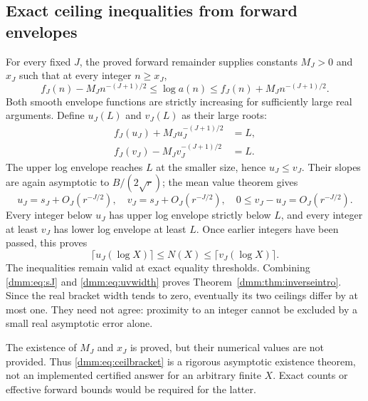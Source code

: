 \documentclass[11pt,letterpaper]{article}
\numberwithin{equation}{section}
\theoremstyle{definition}\newtheorem{definition}[theorem]{Definition}
\theoremstyle{remark}\newtheorem{remark}[theorem]{Remark}
\begin{document}
\subsection{Exact ceiling inequalities from forward envelopes}
For every fixed $J$, the proved forward remainder supplies constants $M_J>0$ and $x_J$ such that at every integer $n\ge x_J$,
\begin{equation}\label{dmm:eq:envelopes}
f_J(n)-M_Jn^{-(J+1)/2}
\le\log a(n)\le
f_J(n)+M_Jn^{-(J+1)/2}.
\end{equation}
Both smooth envelope functions are strictly increasing for sufficiently large real arguments. Define $u_J(L)$ and $v_J(L)$ as their large roots:
\begin{align}\label{dmm:eq:uv}
f_J(u_J)+M_Ju_J^{-(J+1)/2}&=L,\nonumber\\
f_J(v_J)-M_Jv_J^{-(J+1)/2}&=L.
\end{align}
The upper log envelope reaches $L$ at the smaller size, hence $u_J\le v_J$. Their slopes are again asymptotic to $B/(2\sqrt r)$; the mean value theorem gives
\begin{equation}\label{dmm:eq:uvwidth}
u_J=s_J+O_J(r^{-J/2}),\quad
v_J=s_J+O_J(r^{-J/2}),\quad
0\le v_J-u_J=O_J(r^{-J/2}).
\end{equation}
Every integer below $u_J$ has upper log envelope strictly below $L$, and every integer at least $v_J$ has lower log envelope at least $L$. Once earlier integers have been passed, this proves
\begin{equation}\label{dmm:eq:ceilbracket}
\lceil u_J(\log X)\rceil\le N(X)\le\lceil v_J(\log X)\rceil.
\end{equation}
The inequalities remain valid at exact equality thresholds. Combining \eqref{dmm:eq:sJ} and \eqref{dmm:eq:uvwidth} proves Theorem~\ref{dmm:thm:inverseintro}. Since the real bracket width tends to zero, eventually its two ceilings differ by at most one. They need not agree: proximity to an integer cannot be excluded by a small real asymptotic error alone.

The existence of $M_J$ and $x_J$ is proved, but their numerical values are not provided. Thus \eqref{dmm:eq:ceilbracket} is a rigorous asymptotic existence theorem, not an implemented certified answer for an arbitrary finite $X$. Exact counts or effective forward bounds would be required for the latter.
\end{document}
